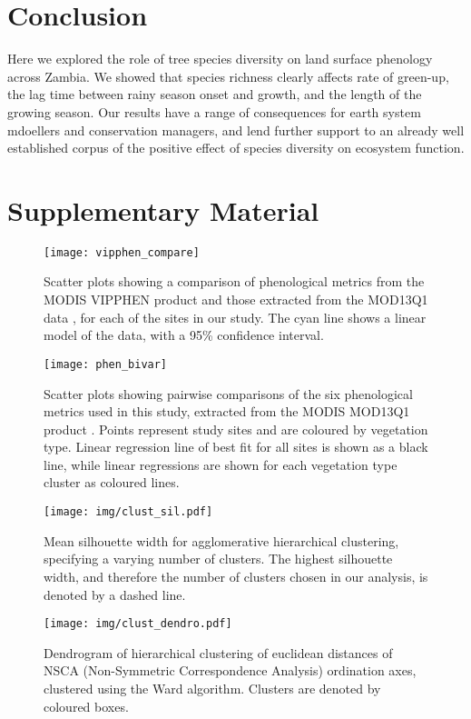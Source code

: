 \documentclass[11pt,a4paper]{article}
\newcommand{\beginsupplement}{%
	\setcounter{table}{0}
	\renewcommand{\thetable}{S\arabic{table}}%
	\setcounter{figure}{0}
	\renewcommand{\thefigure}{S\arabic{figure}}%
	}
\begin{document}
\section{Conclusion}

Here we explored the role of tree species diversity on land surface phenology across Zambia. We showed that species richness clearly affects rate of green-up, the lag time between rainy season onset and growth, and the length of the growing season. Our results have a range of consequences for earth system mdoellers and conservation managers, and lend further support to an already well established corpus of the positive effect of species diversity on ecosystem function.

\printbibliography

\section{Supplementary Material}
\beginsupplement

\begin{figure}[H]
\centering
	\texttt{[image: vipphen\_compare]}
	\caption{Scatter plots showing a comparison of phenological metrics from the MODIS VIPPHEN product \citep{VIPPHEN} and those extracted from the MOD13Q1 data \citep{MOD13Q1}, for each of the sites in our study. The cyan line shows a linear model of the data, with a 95\% confidence interval.}
	\label{vipphen_compare}
\end{figure}



\begin{figure}[H]
\centering
	\texttt{[image: phen\_bivar]}
	\caption{Scatter plots showing pairwise comparisons of the six phenological
		metrics used in this study, extracted from the MODIS MOD13Q1 product
	\citep{MOD13Q1}. Points represent study sites and are coloured by vegetation type. Linear regression
line of best fit for all sites is shown as a black line, while linear
regressions are shown for each vegetation type cluster as coloured lines.}
	\label{phen_bivar}
\end{figure}



\begin{figure}[H]
\centering
	\texttt{[image: img/clust\_sil.pdf]}
	\caption{Mean silhouette width for agglomerative hierarchical clustering, specifying a varying number of clusters. The highest silhouette width, and therefore the number of clusters chosen in our analysis, is denoted by a dashed line.}
	\label{clust_sil}
\end{figure}

\begin{figure}[H]
\centering
	\texttt{[image: img/clust\_dendro.pdf]}
	\caption{Dendrogram of hierarchical clustering of euclidean distances of NSCA (Non-Symmetric Correspondence Analysis) ordination axes, clustered using the Ward algorithm. Clusters are denoted by coloured boxes.}
	\label{clust_dendro}
\end{figure}


\end{document}
